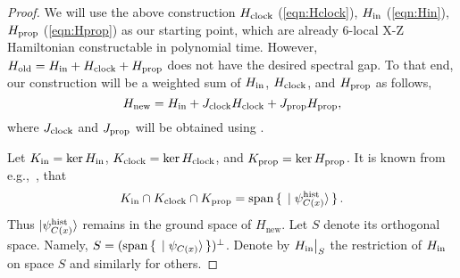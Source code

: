 \begin{proof}
We will use the above construction $H_{\mathrm{clock}}$ (\cref{eqn:Hclock}), $H_{\mathrm{in}}$ (\cref{eqn:Hin}), $H_{\mathrm{prop}}$ (\cref{eqn:Hprop}) as our starting point, which are already 6-local X-Z Hamiltonian constructable in polynomial time. However, $H_{\mathrm{old}}=H_{\mathrm{in}} + H_{\mathrm{clock}} + H_{\mathrm{prop}}$ does not have the desired spectral gap. To that end, our construction will be a weighted sum of $H_{\mathrm{in}}$, $H_{\mathrm{clock}}$, and $H_{\mathrm{prop}}$ as follows,
\begin{equation}
    H_{\mathrm{new}}= H_{\mathrm{in}} + J_{\mathrm{clock}} H_{\mathrm{clock}} + J_{\mathrm{prop}} H_{\mathrm{prop}},
\end{equation}
where $J_{\mathrm{clock}}$ and $J_{\mathrm{prop}}$ will be obtained using .

Let $K_{\mathrm{in}}=\ker H_{\mathrm{in}}$, $K_{\mathrm{clock}}=\ker H_{\mathrm{clock}}$, and $K_{\mathrm{prop}}=\ker H_{\mathrm{prop}}$. It is known from e.g.,~\cite{kitaev2002classical}, that
\[
   K_{\mathrm{in}} \cap K_{\mathrm{clock}} \cap K_{\mathrm{prop}} = \operatorname*{\operatorname{span}}\set{\ket{\psi_{C(x)}^{\mathrm{hist}}}}.
\]
Thus $\ket{\psi_{C(x)}^{\mathrm{hist}}}$ remains in the ground space of $H_{\mathrm{new}}$. Let $S$ denote its orthogonal space. Namely, $S=(\operatorname*{\operatorname{span}}\set{\ket{\psi_{C(x)}}})^\bot$.
Denote by $H_{\mathrm{in}}\big|_S$ the restriction of $H_{\mathrm{in}}$ on space $S$ and similarly for others.




\end{proof}
